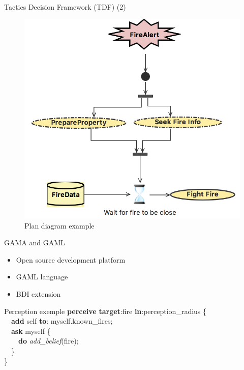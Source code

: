 \documentclass{beamer}
\begin{document}
    \begin{frame}{Tactics Decision Framework (TDF) (2)}
      \begin{figure}[h]
        \includegraphics[scale=0.5]{plan.png}
        \caption{Plan diagram example}
      \end{figure}
    \end{frame}

    \begin{frame}{GAMA and GAML}
      \begin{itemize}
        \item Open source development platform
        \item GAML language
        \item BDI extension
      \end{itemize}
      \begin{block}{Perception exemple}
\textbf{perceive} \textbf{target}:fire \textbf{in}:perception\_radius \{\\
~~\textbf{add} self \textbf{to}: myself.known\_fires;\\
~~\textbf{ask} myself \{\\
~~~~\textbf{do} \textit{add\_belief}(fire);\\
~~\}\\
\}
      \end{block}
    \end{frame}
\end{document}
